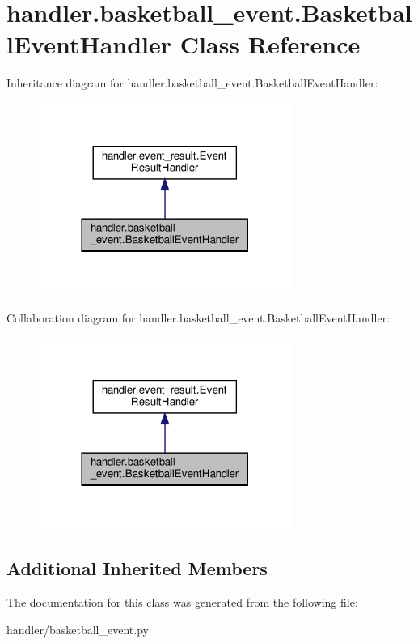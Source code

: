 \hypertarget{classhandler_1_1basketball__event_1_1_basketball_event_handler}{}\section{handler.\+basketball\+\_\+event.\+Basketball\+Event\+Handler Class Reference}
\label{classhandler_1_1basketball__event_1_1_basketball_event_handler}


Inheritance diagram for handler.\+basketball\+\_\+event.\+Basketball\+Event\+Handler\+:\nopagebreak
\begin{figure}[H]
\begin{center}
\leavevmode
\includegraphics[width=234pt]{classhandler_1_1basketball__event_1_1_basketball_event_handler__inherit__graph}
\end{center}
\end{figure}


Collaboration diagram for handler.\+basketball\+\_\+event.\+Basketball\+Event\+Handler\+:\nopagebreak
\begin{figure}[H]
\begin{center}
\leavevmode
\includegraphics[width=234pt]{classhandler_1_1basketball__event_1_1_basketball_event_handler__coll__graph}
\end{center}
\end{figure}
\subsection*{Additional Inherited Members}


The documentation for this class was generated from the following file\+:\begin{DoxyCompactItemize}
\item 
handler/basketball\+\_\+event.\+py\end{DoxyCompactItemize}
